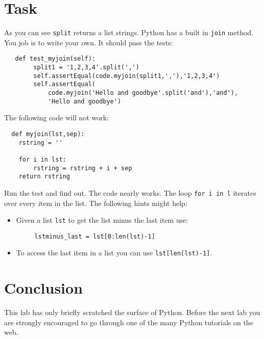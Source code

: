 \documentclass{paper}
\begin{document}
\section{Task}
As you can see {\tt split} returns a list strings. Python has a built
in {\tt join} method. You job is to write your own. It should pass the
tests:
\begin{lstlisting}
   def test_myjoin(self):
        split1 = '1,2,3,4'.split(',')
        self.assertEqual(code.myjoin(split1,','),'1,2,3,4')
        self.assertEqual(
            code.myjoin('Hello and goodbye'.split('and'),'and'),
            'Hello and goodbye')
\end{lstlisting}

The following code will not work:
\begin{lstlisting}
  def myjoin(lst,sep):
    rstring = ''
    
    for i in lst:
        rstring = rstring + i + sep
    return rstring
\end{lstlisting}
Run the test and find out. The code nearly works. The loop {\tt for i
  in l} iterates over every item in the list. The following hints might help:
\begin{itemize}
\item Given a list {\tt lst} to get the list minus the last item use:
  \begin{lstlisting}
     lstminus_last = lst[0:len(lst)-1]
  \end{lstlisting}
\item To access the last item in a list you can use {\tt lst[len(lst)-1]}.
\end{itemize}


\section*{Conclusion}
This lab has only briefly scratched the surface of Python. Before the
next lab you are strongly encouraged to go through one of  the many
Python tutorials on the web. 
\end{document}
